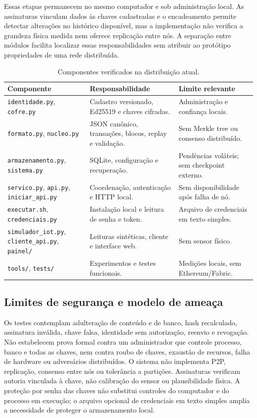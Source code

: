 \documentclass[10pt,a4paper,twocolumn]{article}
\begin{document}
Essas etapas permanecem no mesmo computador e sob administração local. As assinaturas vinculam dados às chaves cadastradas e o encadeamento permite detectar alterações no histórico disponível, mas a implementação não verifica a grandeza física medida nem oferece replicação entre nós. A separação entre módulos facilita localizar essas responsabilidades sem atribuir ao protótipo propriedades de uma rede distribuída.
\begin{table}[t]
\centering\small
\caption{Componentes verificados na distribuição atual.}
\label{tab:modulos}
\begin{tabularx}{\textwidth}{p{}X p{}}
\toprule
Componente & Responsabilidade & Limite relevante \\
\midrule
\texttt{identidade.py}, \texttt{cofre.py} & Cadastro versionado, Ed25519 e chaves cifradas. & Administração e confiança locais. \\
\texttt{formato.py}, \texttt{nucleo.py} & JSON canônico, transações, blocos, replay e validação. & Sem Merkle tree ou consenso distribuído. \\
\texttt{armazenamento.py}, \texttt{sistema.py} & SQLite, configuração e recuperação. & Pendências voláteis; sem checkpoint externo. \\
\texttt{servico.py}, \texttt{api.py}, \texttt{iniciar\_api.py} & Coordenação, autenticação e HTTP local. & Sem disponibilidade após falha de nó. \\
\texttt{executar.sh}, \texttt{credenciais.py} & Instalação local e leitura de senha e token. & Arquivo de credenciais em texto simples. \\
\texttt{simulador\_iot.py}, \texttt{cliente\_api.py}, \texttt{painel/} & Leituras sintéticas, cliente e interface web. & Sem sensor físico. \\
\texttt{tools/}, \texttt{tests/} & Experimentos e testes funcionais. & Medições locais, sem Ethereum/Fabric. \\
\bottomrule
\end{tabularx}
\end{table}

\subsection{Limites de segurança e modelo de ameaça}
Os testes contemplam adulteração de conteúdo e de banco, hash recalculado, assinatura inválida, chave falsa, identidade sem autorização, reenvio e revogação. Não estabelecem prova formal contra um administrador que controle processo, banco e todas as chaves, nem contra roubo de chaves, exaustão de recursos, falha de hardware ou adversários distribuídos. O sistema não implementa P2P, replicação, consenso entre nós ou tolerância a partições. Assinaturas verificam autoria vinculada à chave, não calibração do sensor ou plausibilidade física. A proteção por senha das chaves não substitui controles do computador e do processo em execução; o arquivo opcional de credenciais em texto simples amplia a necessidade de proteger o armazenamento local.
\end{document}

